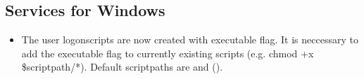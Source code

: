 
 



\subsection{Services for Windows}
\begin{itemize}
\item The user logonscripts are now created with executable flag.
 It is neccessary to add the executable flag to currently existing scripts (e.g. chmod +x \$scriptpath/*).
 Default scriptpaths are  and  ().
\end{itemize}

%

